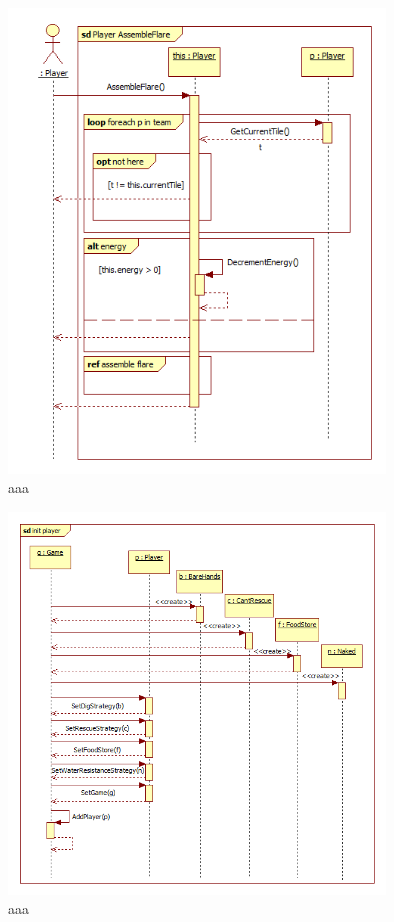 \begin{figure}[H]
	\begin{center}
		\includegraphics[width=10cm]{chapters/chapter03/seqdiag/Player_AssembleFlare.png}
		\caption{aaa}
		\label{bbb}
	\end{center}
\end{figure}
\begin{figure}[H]
	\begin{center}
		\includegraphics[width=10cm]{chapters/chapter03/seqdiag/Game_init_player.png}
		\caption{aaa}
		\label{bbb}
	\end{center}
\end{figure}
